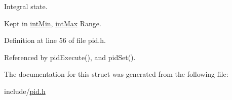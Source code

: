 Integral state. 

Kept in \hyperlink{struct_p_i_d_state_a76c3abc852d5003bd3a2b1cdaa09b80c}{int\-Min}, \hyperlink{struct_p_i_d_state_a85e14db5dc2af5e111772213512512e7}{int\-Max} Range. 

Definition at line 56 of file pid.\-h.



Referenced by pid\-Execute(), and pid\-Set().



The documentation for this struct was generated from the following file\-:\begin{DoxyCompactItemize}
\item 
include/\hyperlink{pid_8h}{pid.\-h}\end{DoxyCompactItemize}
